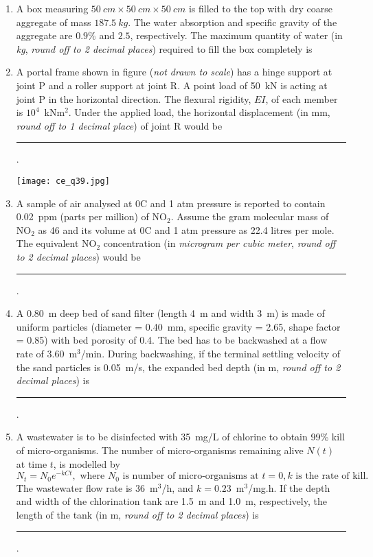 \documentclass[12pt]{article}
\begin{document}
\begin{enumerate}[label= Q.\arabic*,start =26]
	\item A box measuring $50~cm \times 50~cm \times 50~cm$ is filled to the top with dry coarse aggregate of mass $187.5~kg$. The water absorption and specific gravity of the aggregate are $0.9\%$ and $2.5$, respectively. The maximum quantity of water (in \textit{kg}, \textit{round off to 2 decimal places}) required to fill the box completely is \underline{\hspace{2cm}}

	\item  A portal frame shown in figure (\textit{not drawn to scale}) has a hinge support at joint P and a roller support at joint R. A point load of 50~kN is acting at joint P in the horizontal direction. The flexural rigidity, $EI$, of each member is $10^4$~kNm$^2$. Under the applied load, the horizontal displacement (in mm, \textit{round off to 1 decimal place}) of joint R would be \rule{3cm}{0.15mm}.

		\begin{center}{	
			\texttt{[image: ce\_q39.jpg]}
		}\end{center}

	\item A sample of air analysed at 0\textdegree C and 1 atm pressure is reported to contain 0.02~ppm (parts per million) of NO$_2$. Assume the gram molecular mass of NO$_2$ as 46 and its volume at 0\textdegree C and 1 atm pressure as 22.4 litres per mole. The equivalent NO$_2$ concentration (in \textit{microgram per cubic meter}, \textit{round off to 2 decimal places}) would be \rule{3cm}{0.15mm}.

		\vspace{4mm}

	\item A 0.80~m deep bed of sand filter (length 4~m and width 3~m) is made of uniform particles (diameter = 0.40~mm, specific gravity = 2.65, shape factor = 0.85) with bed porosity of 0.4. The bed has to be backwashed at a flow rate of 3.60~m$^3$/min. During backwashing, if the terminal settling velocity of the sand particles is 0.05~m/s, the expanded bed depth (in m, \textit{round off to 2 decimal places}) is \rule{3cm}{0.15mm}.

		\vspace{4mm}

	\item  A wastewater is to be disinfected with 35~mg/L of chlorine to obtain 99\% kill of micro-organisms. The number of micro-organisms remaining alive $N(t)$ at time $t$, is modelled by
		\[
			N_t = N_0 e^{-kC t}, \text{ where } N_0 \text{ is number of micro-organisms at } t = 0, k \text{ is the rate of kill.}
		\]
		The wastewater flow rate is 36~m$^3$/h, and $k = 0.23$~m$^3$/mg.h. If the depth and width of the chlorination tank are 1.5~m and 1.0~m, respectively, the length of the tank (in m, \textit{round off to 2 decimal places}) is \rule{3cm}{0.15mm}.



\end{enumerate}
\end{document}
